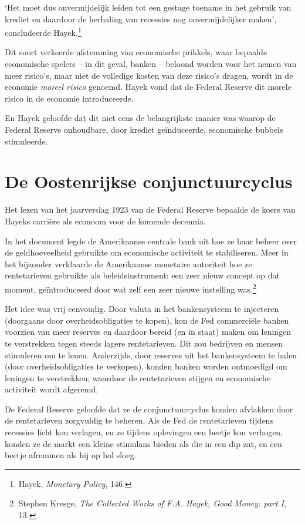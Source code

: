 \documentclass[
  a5paper,
  smalldemyvopaper,11pt,twoside,onecolumn,openright,extrafontsizes,
hidelinks]{memoir}
\begin{document}
`Het moet dus onvermijdelijk leiden tot een gestage toename in het
gebruik van krediet en daardoor de herhaling van recessies nog
onvermijdelijker maken', concludeerde Hayek.\footnote{\hspace{0pt}Hayek,
  \emph{Monetary Policy}, 146.}

Dit soort verkeerde afstemming van economische prikkels, waar bepaalde
economische spelers -- in dit geval, banken -- beloond worden voor het
nemen van meer risico's, maar niet de volledige kosten van deze risico's
dragen, wordt in de economie \emph{moreel risico} genoemd. Hayek vond
dat de Federal Reserve dit morele risico in de economie introduceerde.

En Hayek geloofde dat dit niet eens de belangrijkste manier was waarop
de Federal Reserve onhoudbare, door krediet geïnduceerde, economische
bubbels stimuleerde.

\section{De Oostenrijkse
conjunctuurcyclus}\label{de-oostenrijkse-conjunctuurcyclus}

Het lezen van het jaarverslag 1923 van de Federal Reserve bepaalde de
koers van Hayeks carrière als econoom voor de komende decennia.

In het document legde de Amerikaanse centrale bank uit hoe ze haar
beheer over de geldhoeveelheid gebruikte om economische activiteit te
stabiliseren. Meer in het bijzonder verklaarde de Amerikaanse monetaire
autoriteit hoe ze rentetarieven gebruikte als beleidsinstrument: een
zeer nieuw concept op dat moment, geïntroduceerd door wat zelf een zeer
nieuwe instelling was.\footnote{Stephen Kresge, \emph{The Collected
  Works of F.A. Hayek, Good Money: part I}, 13.}

Het idee was vrij eenvoudig. Door valuta in het bankensysteem te
injecteren (doorgaans door overheidsobligaties te kopen), kon de Fed
commerciële banken voorzien van meer reserves en daardoor bereid (en in
staat) maken om leningen te verstrekken tegen steeds lagere
rentetarieven. Dit zou bedrijven en mensen stimuleren om te lenen.
Anderzijds, door reserves uit het bankensysteem te halen (door
overheidsobligaties te verkopen), konden banken worden ontmoedigd om
leningen te verstrekken, waardoor de rentetarieven stijgen en
economische activiteit wordt afgeremd.

De Federal Reserve geloofde dat ze de conjunctuurcyclus konden afvlakken
door de rentetarieven zorgvuldig te beheren. Als de Fed de rentetarieven
tijdens recessies licht kon verlagen, en ze tijdens oplevingen een
beetje kon verhogen, konden ze de markt een kleine stimulans bieden als
die in een dip zat, en een beetje afremmen als hij op hol sloeg.
\end{document}
